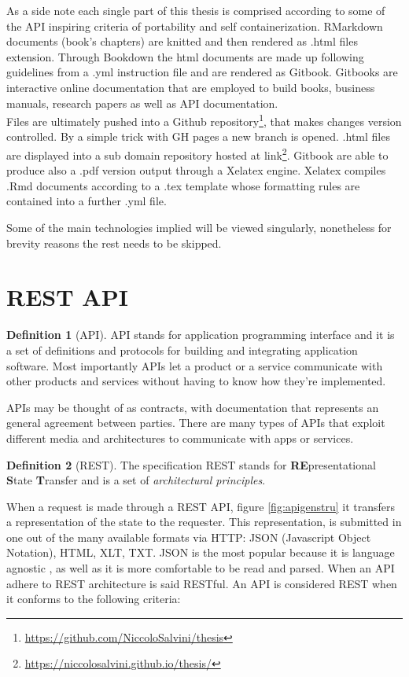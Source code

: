 \documentclass[
  12pt,
  a4paper,
  oneside]{book}
\DeclareRobustCommand{\href}[2]{#2\footnote{\url{#1}}}
\theoremstyle{definition}
\newtheorem{definition}{Definition}[chapter]
\theoremstyle{definition}
\theoremstyle{definition}
\theoremstyle{remark}
\begin{document}
As a side note each single part of this thesis is comprised according to some of the API inspiring criteria of portability and self containerization. RMarkdown \citep{rmarkdown1} documents (book's chapters) are knitted and then rendered as .html files extension. Through Bookdown \citep{bookdown2} the html documents are made up following guidelines from a .yml instruction file and are rendered as Gitbook. Gitbooks are interactive online documentation that are employed to build books, business manuals, research papers as well as API documentation.\\
Files are ultimately pushed into a \href{https://github.com/NiccoloSalvini/thesis}{Github repository}, that makes changes version controlled. By a simple trick with GH pages a new branch is opened. .html files are displayed into a sub domain repository hosted at \href{https://niccolosalvini.github.io/thesis/}{link}. Gitbook are able to produce also a .pdf version output through a Xelatex engine. Xelatex compiles .Rmd documents according to a .tex template whose formatting rules are contained into a further .yml file.

Some of the main technologies implied will be viewed singularly, nonetheless for brevity reasons the rest needs to be skipped.

\hypertarget{rest-api}{%
\section{REST API}\label{rest-api}}

\begin{definition}[API]
\protect\hypertarget{def:api}{}{\label{def:api} {} }API stands for application programming interface and it is a set of definitions and protocols for building and integrating application software. Most importantly APIs let a product or a service communicate with other products and services without having to know how they're implemented.
\end{definition}
APIs may be thought of as contracts, with documentation that represents an general agreement between parties.
There are many types of APIs that exploit different media and architectures to communicate with apps or services.
\begin{definition}[REST]
\protect\hypertarget{def:rest}{}{\label{def:rest} {} }The specification REST stands for \textbf{RE}presentational \textbf{S}tate \textbf{T}ransfer and is a set of \emph{architectural principles}.
\end{definition}
When a request is made through a REST API, figure \ref{fig:apigenstru} it transfers a representation of the state to the requester. This representation, is submitted in one out of the many available formats via HTTP: JSON (Javascript Object Notation), HTML, XLT, TXT. JSON is the most popular because it is language agnostic \citep{what_is_a_rest_api}, as well as it is more comfortable to be read and parsed. When an API adhere to REST architecture is said RESTful.
An API is considered REST when it conforms to the following criteria:
\end{document}
